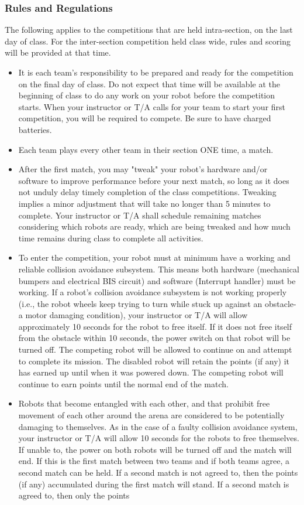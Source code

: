 \documentclass{article}
\begin{document}
\subsubsection{Rules and Regulations}
The following applies to the competitions that are held intra-section, on the last day of class.  For the inter-section competition held class wide, rules and scoring will be provided at that time. \\
\begin{itemize}
    \item It is each team’s responsibility to be prepared and ready for the competition on the final day of class.  Do not expect that time will be available at the beginning of class to do any work on your robot before the competition starts.  When your instructor or T/A calls for your team to start your first competition, you will be required to compete.  Be sure to have charged batteries.
    \item Each team plays every other team in their section ONE time, a match.
    \item After the first match, you may "tweak" your robot's hardware and/or software to improve performance before your next match, so long as it does not unduly delay timely completion of the class competitions.  Tweaking implies a minor adjustment that will take no longer than 5 minutes to complete.  Your instructor or T/A shall schedule remaining matches considering which robots are ready, which are being tweaked and how much time remains during class to
complete all activities.
    \item To enter the competition, your robot must at minimum have a working and reliable collision avoidance subsystem.  This means both hardware (mechanical bumpers and electrical BIS circuit) and software (Interrupt handler) must be working.  If a robot's collision avoidance subsystem is not working properly (i.e., the robot wheels keep trying to turn while stuck up against an obstacle- a motor damaging condition), your instructor or T/A will allow approximately 10 seconds for the robot to free itself.  If it does not free itself from the obstacle within 10 seconds, the power switch on that robot will be turned off.  The competing robot will be allowed to continue on and attempt to complete its mission. The disabled robot will retain the points (if any) it has earned up until when it was powered down.  The competing robot will continue to earn points until the normal end of the match.
    \item Robots that become entangled with each other, and that prohibit free movement of each other around the arena are considered to be potentially damaging to themselves.  As in the case of a faulty collision avoidance system, your instructor or T/A will allow 10 seconds for the robots to free themselves.  If unable to, the power on both robots will be turned off and the match will end. If this is the first match between two teams and if both teams agree, a second match can be held.  If a second match is not agreed to, then the points (if any) accumulated during the first match will stand.  If a second match is agreed to, then only the points

\end{itemize}
\end{document}
